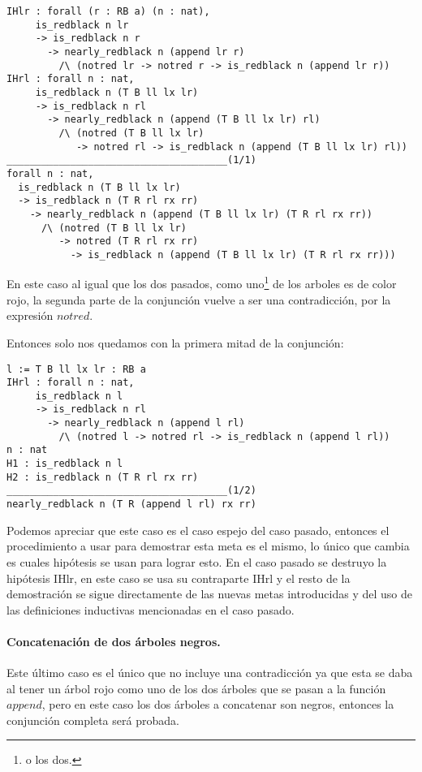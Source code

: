 \begin{verbatim}
IHlr : forall (r : RB a) (n : nat),
     is_redblack n lr
     -> is_redblack n r
       -> nearly_redblack n (append lr r)
         /\ (notred lr -> notred r -> is_redblack n (append lr r))
IHrl : forall n : nat,
     is_redblack n (T B ll lx lr)
     -> is_redblack n rl
       -> nearly_redblack n (append (T B ll lx lr) rl)
         /\ (notred (T B ll lx lr)
            -> notred rl -> is_redblack n (append (T B ll lx lr) rl))
______________________________________(1/1)
forall n : nat,
  is_redblack n (T B ll lx lr)
  -> is_redblack n (T R rl rx rr)
    -> nearly_redblack n (append (T B ll lx lr) (T R rl rx rr))
      /\ (notred (T B ll lx lr)
         -> notred (T R rl rx rr)
           -> is_redblack n (append (T B ll lx lr) (T R rl rx rr)))
\end{verbatim}

En este caso al igual que los dos pasados, como uno\footnote{o los dos.} de los arboles es de
color rojo, la segunda parte de la conjunci\'on vuelve a ser una contradicci\'on, por la expresión
$notred$.

Entonces solo nos quedamos con la primera mitad de la conjunci\'on:

\begin{verbatim}
l := T B ll lx lr : RB a
IHrl : forall n : nat,
     is_redblack n l
     -> is_redblack n rl
       -> nearly_redblack n (append l rl)
         /\ (notred l -> notred rl -> is_redblack n (append l rl))
n : nat
H1 : is_redblack n l
H2 : is_redblack n (T R rl rx rr)
______________________________________(1/2)
nearly_redblack n (T R (append l rl) rx rr)
\end{verbatim}

Podemos apreciar que este caso es el caso espejo del caso pasado, entonces el procedimiento a usar
para demostrar esta meta es el mismo, lo \'unico que cambia es cuales hip\'otesis se usan para
lograr esto. En el caso pasado se destruyo la hip\'otesis IHlr, en este caso se usa su contraparte
IHrl y el resto de la demostraci\'on se sigue directamente de las nuevas metas introducidas y del
uso de las definiciones inductivas mencionadas en el caso pasado.

\paragraph{Concatenaci\'on de dos \'arboles negros.}

Este \'ultimo caso es el \'unico que no incluye una contradicci\'on ya que esta se
daba al tener un \'arbol rojo como uno de los dos \'arboles que se pasan a la funci\'on 
\hyperref[func_app]{$append$}, pero en este caso los dos \'arboles a concatenar son negros, entonces 
la conjunci\'on completa ser\'a probada.


